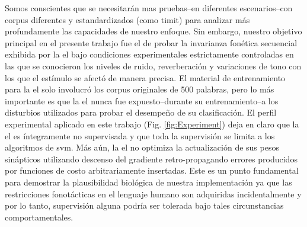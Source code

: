 Somos conscientes que se necesitarán mas pruebas--en diferentes escenarios--con corpus diferentes y estandardizados (como \gls{timit}) para analizar más profundamente las capacidades de nuestro enfoque.
Sin embargo, nuestro objetivo principal en el presente trabajo fue el de probar la invarianza fonética secuencial exhibida por la \gls{el} bajo condiciones experimentales estrictamente controladas en las que se conocieron los niveles de ruido, reverberación y variaciones de tono con los que el estímulo se afectó de manera precisa. El material de entrenamiento para la \gls{el} solo involucró los corpus originales de 500 palabras, pero lo más importante es que la \gls{el} nunca fue expuesto--durante su entrenamiento--a los disturbios utilizados para probar el desempeño de su clasificación. El perfil experimental aplicado en este trabajo (Fig. \ref{fig:Experiment}) deja en claro que la \gls{el} es íntegramente no supervisada y que toda la supervisión se limita a los algoritmos de \gls{svm}. Más aún, la \gls{el} no optimiza la actualización de sus pesos sinápticos utilizando descenso del gradiente retro-propagando errores producidos por funciones de costo arbitrariamente insertadas. Este es un punto fundamental para demostrar la plausibilidad biológica de nuestra implementación ya que las restricciones fonotácticas en el lenguaje humano son adquiridas incidentalmente \cite{BRENT199693,saffran_1997} y por lo tanto, supervisión alguna podría ser tolerada bajo tales circunstancias comportamentales.


